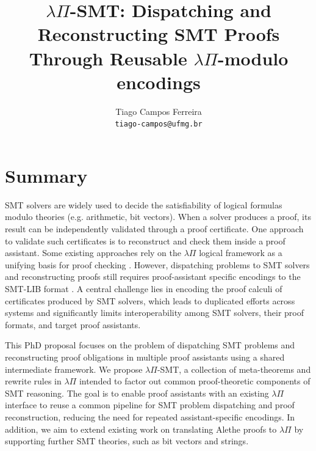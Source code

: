 \documentclass[11pt,twoside]{article}
\author{Tiago Campos Ferreira\\\texttt{tiago-campos@ufmg.br}}
\title{$\lambda\Pi$-SMT: Dispatching and Reconstructing SMT Proofs Through Reusable $\lambda\Pi$-modulo encodings}
\date{}
\begin{document}


\maketitle

\ifdefined\ShowAbstract \begin{abstract}
\end{abstract} \fi


\section{Summary}

SMT solvers are widely used to decide the satisfiability of logical formulas modulo theories (e.g. arithmetic, bit vectors). When a solver produces a proof, its result can be independently validated through a proof certificate. One approach to validate such certificates is to reconstruct and check them inside a proof assistant.
Some existing approaches rely on the $\lambda\Pi$ logical framework as a unifying basis for proof checking \cite{coltellacci24smt}.
However, dispatching problems to SMT solvers and reconstructing proofs still requires proof-assistant specific encodings to the SMT-LIB format \cite{smtlib}.
A central challenge lies in encoding the proof calculi of certificates produced by SMT solvers, which leads to duplicated efforts across systems and significantly limits interoperability among SMT solvers, their proof formats, and target proof assistants.

This PhD proposal focuses on the problem of dispatching SMT problems and reconstructing proof obligations in multiple proof assistants using a shared intermediate framework.
We propose $\lambda\Pi$-SMT, a collection of meta-theorems and rewrite rules in $\lambda\Pi$ intended to factor out common proof-theoretic components of SMT reasoning.
The goal is to enable proof assistants with an existing $\lambda\Pi$ interface to reuse a common pipeline for SMT problem dispatching and proof reconstruction, reducing the need for repeated assistant-specific encodings.
In addition, we aim to extend existing work on translating Alethe proofs to $\lambda\Pi$ by supporting further SMT theories, such as bit vectors and strings. 
\end{document}
